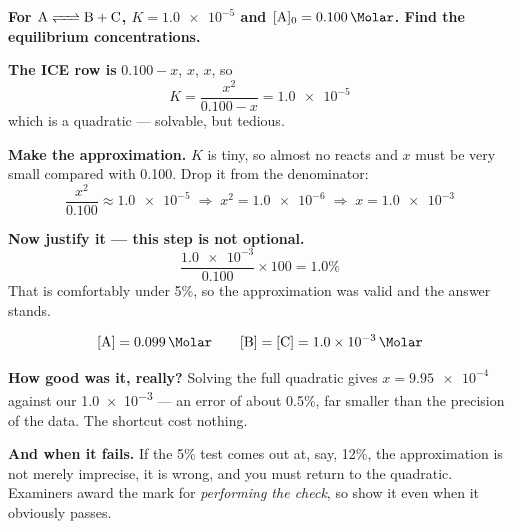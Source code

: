 \documentclass{apchem-worksheet}
\begin{document}
\begin{workedexample}
\textbf{For $\ce{A <=> B + C}$, $K = \num{1.0e-5}$ and $[\ce{A}]_{0} =
\SI{0.100}{\Molar}$. Find the equilibrium concentrations.}

\textbf{The ICE row is} $0.100-x$, $x$, $x$, so
\[ K = \frac{x^{2}}{0.100-x} = \num{1.0e-5} \]
which is a quadratic --- solvable, but tedious.

\textbf{Make the approximation.} $K$ is tiny, so almost no 
reacts and $x$ must be very small compared with 0.100. Drop it from the
denominator:
\[ \frac{x^{2}}{0.100} \approx \num{1.0e-5}
   \;\Longrightarrow\;
   x^{2} = \num{1.0e-6}
   \;\Longrightarrow\;
   x = \num{1.0e-3} \]

\textbf{Now justify it --- this step is not optional.}
\[ \frac{\num{1.0e-3}}{0.100} \times 100 = 1.0\% \]
That is comfortably under 5\%, so the approximation was valid and the
answer stands.

\[ [\ce{A}] = \SI{0.099}{\Molar}
   \qquad
   [\ce{B}] = [\ce{C}] = \SI{1.0e-3}{\Molar} \]

\textbf{How good was it, really?} Solving the full quadratic gives
$x = \num{9.95e-4}$ against our \num{1.0e-3} --- an error of about
0.5\%, far smaller than the precision of the data. The shortcut cost
nothing.

\textbf{And when it fails.} If the 5\% test comes out at, say, 12\%,
the approximation is not merely imprecise, it is wrong, and you must
return to the quadratic. Examiners award the mark for \emph{performing
the check}, so show it even when it obviously passes.
\end{workedexample}
\end{document}
